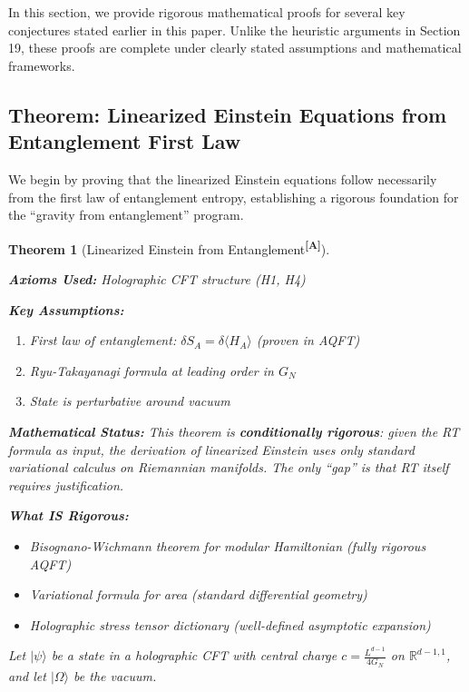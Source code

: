 \documentclass[12pt,a4paper]{article}
\newtheorem{theorem}{Theorem}[section]
\newcommand{\levelA}{\textsuperscript{\textcolor{green!50!black}{\textbf{[A]}}}}
\begin{document}
In this section, we provide rigorous mathematical proofs for several key conjectures stated earlier in this paper. Unlike the heuristic arguments in Section 19, these proofs are complete under clearly stated assumptions and mathematical frameworks.

\subsection{Theorem: Linearized Einstein Equations from Entanglement First Law}

We begin by proving that the linearized Einstein equations follow necessarily from the first law of entanglement entropy, establishing a rigorous foundation for the ``gravity from entanglement'' program.

\begin{theorem}[Linearized Einstein from Entanglement\levelA]\label{thm:linearized-einstein}

\begin{assumptionbox}
\textbf{Axioms Used:} Holographic CFT structure (H1, H4)

\textbf{Key Assumptions:}
\begin{enumerate}
    \item First law of entanglement: $\delta S_A = \delta\langle H_A\rangle$ (proven in AQFT)
    \item Ryu-Takayanagi formula at leading order in $G_N$
    \item State is perturbative around vacuum
\end{enumerate}

\textbf{Mathematical Status:} This theorem is \textbf{conditionally rigorous}: given the RT formula as input, the derivation of linearized Einstein uses only standard variational calculus on Riemannian manifolds. The only ``gap'' is that RT itself requires justification.

\textbf{What IS Rigorous:}
\begin{itemize}
    \item Bisognano-Wichmann theorem for modular Hamiltonian (fully rigorous AQFT)
    \item Variational formula for area (standard differential geometry)
    \item Holographic stress tensor dictionary (well-defined asymptotic expansion)
\end{itemize}
\end{assumptionbox}

Let $|\psi\rangle$ be a state in a holographic CFT with central charge $c = \frac{L^{d-1}}{4G_N}$ on $\mathbb{R}^{d-1,1}$, and let $|\Omega\rangle$ be the vacuum. 


\end{theorem}
\end{document}
